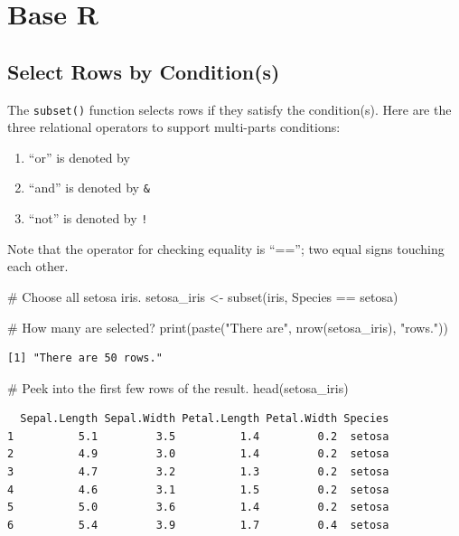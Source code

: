 \documentclass[
  letterpaper,
]{book}
\newenvironment{Shaded}{\begin{snugshade}}{\end{snugshade}}
\newcommand{\CommentTok}[1]{\textcolor[rgb]{0.37,0.37,0.37}{#1}}
\newcommand{\FunctionTok}[1]{\textcolor[rgb]{0.28,0.35,0.67}{#1}}
\newcommand{\NormalTok}[1]{\textcolor[rgb]{0.00,0.23,0.31}{#1}}
\newcommand{\OtherTok}[1]{\textcolor[rgb]{0.00,0.23,0.31}{#1}}
\newcommand{\SpecialCharTok}[1]{\textcolor[rgb]{0.37,0.37,0.37}{#1}}
\newcommand{\StringTok}[1]{\textcolor[rgb]{0.13,0.47,0.30}{#1}}
\begin{document}
\section{Base R}\label{base-r}

\subsection{Select Rows by
Condition(s)}\label{select-rows-by-conditions}

The \texttt{subset()} function selects rows if they satisfy the
condition(s). Here are the three relational operators to support
multi-parts conditions:

\begin{enumerate}
\def\labelenumi{\arabic{enumi}.}
\item
  ``or'' is denoted by \texttt{\textbar{}}
\item
  ``and'' is denoted by \texttt{\&}
\item
  ``not'' is denoted by \texttt{!}
\end{enumerate}

Note that the operator for checking equality is ``==''; two equal signs
touching each other.

\begin{Shaded}
\begin{Highlighting}[]
\CommentTok{\# Choose all setosa iris. }
\NormalTok{setosa\_iris }\OtherTok{\textless{}{-}} \FunctionTok{subset}\NormalTok{(iris, Species }\SpecialCharTok{==} \StringTok{\textquotesingle{}setosa\textquotesingle{}}\NormalTok{)}

\CommentTok{\# How many are selected?}
\FunctionTok{print}\NormalTok{(}\FunctionTok{paste}\NormalTok{(}\StringTok{"There are"}\NormalTok{, }\FunctionTok{nrow}\NormalTok{(setosa\_iris), }\StringTok{"rows."}\NormalTok{))}
\end{Highlighting}
\end{Shaded}

\begin{verbatim}
[1] "There are 50 rows."
\end{verbatim}

\begin{Shaded}
\begin{Highlighting}[]
\CommentTok{\# Peek into the first few rows of the result.}
\FunctionTok{head}\NormalTok{(setosa\_iris)}
\end{Highlighting}
\end{Shaded}

\begin{verbatim}
  Sepal.Length Sepal.Width Petal.Length Petal.Width Species
1          5.1         3.5          1.4         0.2  setosa
2          4.9         3.0          1.4         0.2  setosa
3          4.7         3.2          1.3         0.2  setosa
4          4.6         3.1          1.5         0.2  setosa
5          5.0         3.6          1.4         0.2  setosa
6          5.4         3.9          1.7         0.4  setosa
\end{verbatim}
\end{document}
